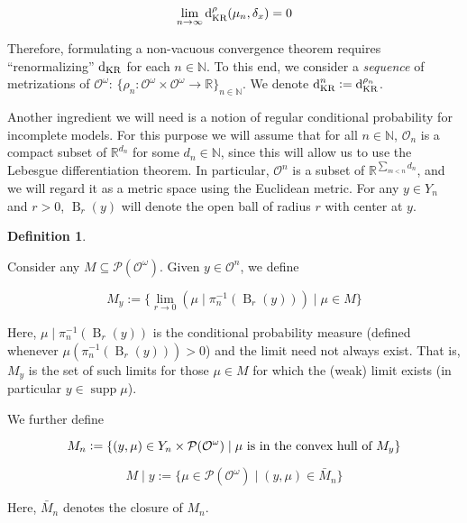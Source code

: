 \documentclass[11pt]{article}
\theoremstyle{definition}
\newtheorem{definition}{Definition}%
\theoremstyle{plain}
\newcommand{\Nats}{\mathbb{N}}
\newcommand{\Reals}{\mathbb{R}}
\newcommand{\Sq}[2]{\{#1\}_{#2 \in \Nats}}
\newcommand{\Sqn}[1]{\Sq{#1}{n}}
\newcommand{\B}{\operatorname{B}}
\newcommand{\PM}{\mathcal{P}}
\DeclareMathOperator{\Sp}{supp}
\newcommand{\DKR}{\operatorname{d}_{\textnormal{KR}}}
\newcommand{\Ob}{\mathcal{O}}
\newcommand{\OO}{\Ob^\omega}
\newcommand{\PMO}{\PM(\OO)}
\begin{document}
\begin{equation}
\lim_{n \rightarrow \infty} \DKR^\rho(\mu_n, \delta_x) = 0
\end{equation}

Therefore, formulating a non-vacuous convergence theorem requires \enquote{renormalizing} $\DKR$ for each $n \in \Nats$. To this end, we consider a \emph{sequence} of metrizations of $\OO$: $\Sqn{\rho_n: \OO \times \OO \rightarrow \Reals}$. We denote $\DKR^n:=\DKR^{\rho_n}$.

Another ingredient we will need is a notion of regular conditional probability for incomplete models. For this purpose we will assume that for all $n \in \Nats$, $\Ob_n$ is a compact subset of $\Reals^{d_n}$ for some $d_n \in \Nats$, since this will allow us to use the Lebesgue differentiation theorem. In particular, $\Ob^n$ is a subset of $\Reals^{\sum_{m < n} d_n}$, and we will regard it as a metric space using the Euclidean metric. For any $y \in Y_n$ and $r > 0$, $\B_r(y)$ will denote the open ball of radius $r$ with center at $y$.

\begin{samepage}
\begin{definition}
\label{def:update_incomplete}

Consider any $M \subseteq \PMO$. Given $y \in \Ob^n$, we define

\begin{equation}
M_y:=\{\lim_{r \rightarrow 0}{(\mu \mid \pi_n^{-1}(\B_r(y)))} \mid \mu \in M\}
\end{equation}

Here, $\mu \mid \pi_n^{-1}(\B_r(y))$ is the conditional probability measure (defined whenever $\mu(\pi_n^{-1}(\B_r(y))) > 0$) and the limit need not always exist. That is, $M_y$ is the set of such limits for those $\mu \in M$ for which the (weak) limit exists (in particular $y \in \Sp{\mu}$).

We further define

\begin{equation}
M_n:=\{(y,\mu) \in Y_n \times \PMO \mid \mu \textnormal{ is in the convex hull of } M_y\}
\end{equation}

\begin{equation}
M \mid y:=\{\mu \in \PMO \mid (y,\mu) \in \bar{M}_n\}
\end{equation}

Here, $\bar{M}_n$ denotes the closure of $M_n$.

\end{definition}
\end{samepage}
\end{document}
